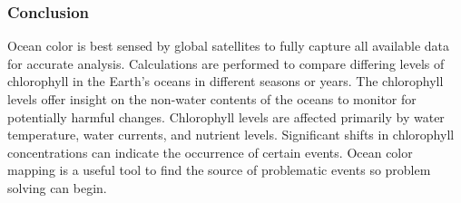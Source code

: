 \begin{frame}\frametitle{Conclusion} 
Ocean color is best sensed by global satellites to fully capture all available data for accurate analysis. Calculations are performed to compare differing levels of chlorophyll in the Earth’s oceans in different seasons or years. The chlorophyll levels offer insight on the non-water contents of the oceans to monitor for potentially harmful changes. Chlorophyll levels are affected primarily by water temperature, water currents, and nutrient levels. Significant shifts in chlorophyll concentrations can indicate the occurrence of certain events. Ocean color mapping is a useful tool to find the source of problematic events so problem solving can begin. 
\end{frame}
